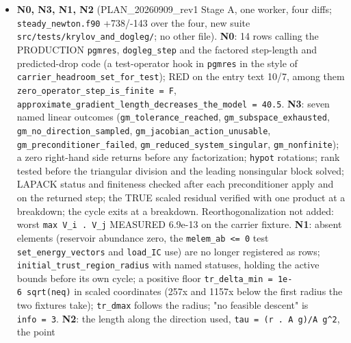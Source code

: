 \documentclass[english,a4paper]{my_memo}
\begin{document}
\begin{itemize}
  \texttt{constrained\_chemical\_equilibrium}, \texttt{diffusive\_photochemistry}): a
  rejected attempt is not yet without consequence; (2) one interval of the
  order sequence (\texttt{H} 6.48e-5 s from the 0.405 controller reduction) sits
  2.3x off the \texttt{H\^{}2} law the other seven follow, unexplained, for N16b;
  (3) \texttt{err\_rtol\ =\ 1e-3}, \texttt{err\_atol\ =\ 1e-12} are flat, unvalidated and cover
  no species (N16b); the gate now shortens physical-mode steps by about
  two at the sampled steps on this case.
\item
  \textbf{N0, N3, N1, N2} (PLAN\_20260909\_rev1 Stage A, one worker, four diffs;
  \texttt{steady\_newton.f90} +738/-143 over the four, new suite
  \texttt{src/tests/krylov\_and\_dogleg/}; no other file). \textbf{N0}: 14 rows calling
  the PRODUCTION \texttt{pgmres}, \texttt{dogleg\_step} and the factored step-length and
  predicted-drop code (a test-operator hook in \texttt{pgmres} in the style of
  \texttt{carrier\_headroom\_set\_for\_test}); RED on the entry text 10/7, among them
  \texttt{zero\_operator\_step\_is\_finite\ =\ F},
  \texttt{approximate\_gradient\_length\_decreases\_the\_model\ =\ 40.5}. \textbf{N3}: seven
  named linear outcomes (\texttt{gm\_tolerance\_reached}, \texttt{gm\_subspace\_exhausted},
  \texttt{gm\_no\_direction\_sampled}, \texttt{gm\_jacobian\_action\_unusable},
  \texttt{gm\_preconditioner\_failed}, \texttt{gm\_reduced\_system\_singular}, \texttt{gm\_nonfinite});
  a zero right-hand side returns before any factorization; \texttt{hypot}
  rotations; rank tested before the triangular division and the leading
  nonsingular block solved; LAPACK status and finiteness checked after each
  preconditioner apply and on the returned step; the TRUE scaled residual
  verified with one product at a breakdown; the cycle exits at a breakdown.
  Reorthogonalization not added: worst \texttt{max\ \textbar{}V\_i\ .\ V\_j\textbar{}} MEASURED 6.9e-13
  on the carrier fixture. \textbf{N1}: absent elements (reservoir abundance
  zero, the \texttt{melem\_ab\ \textless{}=\ 0} test \texttt{set\_energy\_vectors} and \texttt{load\_IC} use)
  are no longer registered as rows; \texttt{initial\_trust\_region\_radius} with
  named statuses, holding the active bounds before its own cycle; a
  positive floor \texttt{tr\_delta\_min\ =\ 1e-6\ sqrt(neq)} in scaled coordinates
  (257x and 1157x below the first radius the two fixtures take); \texttt{tr\_dmax}
  follows the radius; "no feasible descent" is \texttt{info\ =\ 3}. \textbf{N2}: the
  length along the direction used, \texttt{tau\ =\ (r\ .\ A\ g)/\textbar{}\textbar{}A\ g\textbar{}\textbar{}\^{}2}, the point

\end{itemize}
\end{document}
